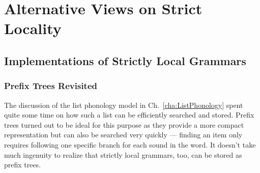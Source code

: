 \chapter{Alternative Views on Strict Locality}
\label{cha:SLImplement}

\section{Implementations of Strictly Local Grammars}

\subsection{Prefix Trees Revisited}

The discussion of the list phonology model in Ch.~\ref{cha:ListPhonology} spent quite some time on how such a list can be efficiently searched and stored.
Prefix trees turned out to be ideal for this purpose as they provide a more compact representation but can also be searched very quickly --- finding an item only requires following one specific branch for each sound in the word.
It doesn't take much ingenuity to realize that strictly local grammars, too, can be stored as prefix trees.
%
